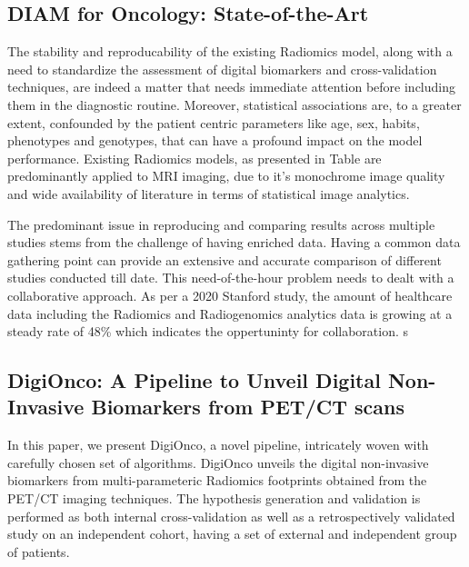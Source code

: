\documentclass[final,1p,times,twocolumn]{elsarticle}
\begin{document}
\subsection{DIAM for Oncology: State-of-the-Art}
The stability and reproducability of the existing Radiomics model, along with a need to standardize the assessment of digital biomarkers and cross-validation techniques, are indeed a matter that needs immediate attention before including them in the diagnostic routine. Moreover, statistical associations are, to a greater extent, confounded by the patient centric parameters like age, sex, habits, phenotypes and genotypes, that can have a profound impact on the model performance. Existing Radiomics models, as presented in Table are predominantly applied to MRI imaging, due to it's monochrome image quality and wide availability of literature in terms of statistical image analytics.

The predominant issue in reproducing and comparing results across multiple studies stems from the challenge of having enriched data. Having a common data gathering point can provide an extensive and accurate comparison of different studies conducted till date. This need-of-the-hour problem needs to dealt with a collaborative approach. As per a 2020 Stanford study, the amount of healthcare data including the Radiomics and Radiogenomics analytics data is growing at a steady rate of 48\% which indicates the oppertuninty for collaboration. s

\subsection{DigiOnco: A Pipeline to Unveil Digital Non-Invasive Biomarkers from PET/CT scans}

In this paper, we present DigiOnco, a novel pipeline, intricately woven with carefully chosen set of algorithms. DigiOnco unveils the digital non-invasive biomarkers from multi-parameteric Radiomics footprints obtained from the PET/CT imaging techniques. The hypothesis generation and validation is performed as both internal cross-validation as well as a retrospectively validated study on an independent cohort, having a set of external and independent group of patients.
\end{document}
